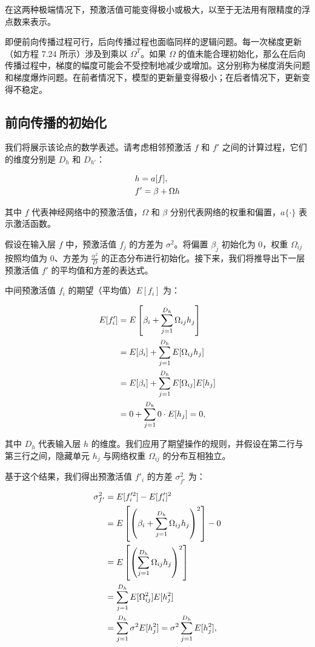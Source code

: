 \documentclass[lang=cn,newtx,10pt,scheme=chinese]{elegantbook}
\begin{document}
在这两种极端情况下，预激活值可能变得极小或极大，以至于无法用有限精度的浮点数来表示。

即便前向传播过程可行，后向传播过程也面临同样的逻辑问题。每一次梯度更新（如方程 7.24 所示）涉及到乘以 \(\Omega^T\)。如果 \(\Omega\) 的值未能合理初始化，那么在后向传播过程中，梯度的幅度可能会不受控制地减少或增加。这分别称为梯度消失问题和梯度爆炸问题。在前者情况下，模型的更新量变得极小；在后者情况下，更新变得不稳定。

\subsection{前向传播的初始化}

我们将展示该论点的数学表述。请考虑相邻预激活 \(f\) 和 \(f'\) 之间的计算过程，它们的维度分别是 \(D_h\) 和 \(D_{h'}\)：

\begin{align}
&h = a[f], \notag \\
&f' = \beta + \Omega h 
\end{align} 

其中 \(f\) 代表神经网络中的预激活值，\(\Omega\) 和 \(\beta\) 分别代表网络的权重和偏置，\(a\{\cdot\}\) 表示激活函数。

假设在输入层 \(f\) 中，预激活值 \(f_j\) 的方差为 \(\sigma^2\)。将偏置 \(\beta_j\) 初始化为 0，权重 \(\Omega_{ij}\) 按照均值为 0、方差为 \(\frac{\alpha^2}{D}\) 的正态分布进行初始化。接下来，我们将推导出下一层预激活值 \(f'\) 的平均值和方差的表达式。

中间预激活值 \(f_i\) 的期望（平均值）\(E[f_i]\) 为：

\begin{align}
E[f_i^\prime] &= E\left[\beta_i + \sum_{j=1}^{D_h} \Omega_{ij}h_j \right] \notag  \\
&= E[\beta_i] + \sum_{j=1}^{D_h} E[\Omega_{ij}h_j] \notag \\
&= E[\beta_i] + \sum_{j=1}^{D_h} E[\Omega_{ij}] E[h_j] \notag \\
&= 0 + \sum_{j=1}^{D_h} 0 \cdot E[h_j] = 0 , 
\end{align}

其中 \(D_h\) 代表输入层 \(h\) 的维度。我们应用了期望操作的规则，并假设在第二行与第三行之间，隐藏单元 \(h_j\) 与网络权重 \(\Omega_{ij}\) 的分布互相独立。

基于这个结果，我们得出预激活值 \(f'_i\) 的方差 \(\sigma_{f'}^2\) 为：

\begin{align}
\sigma_{f'}^2 &= E[f_i'^2] - E[f_i']^2 \notag \\
&= E\left[\left(\beta_i + \sum_{j=1}^{D_h} \Omega_{ij}h_j \right)^2\right] - 0 \notag \\
&= E\left[\left( \sum_{j=1}^{D_h} \Omega_{ij}h_j \right)^2\right] \notag \\
&= \sum_{j=1}^{D_h} E[\Omega_{ij}^2] E[h_j^2] \notag \\
&= \sum_{j=1}^{D_h} \sigma^2 E[h_j^2] = \sigma^2 \sum_{j=1}^{D_h} E[h_j^2], 
\end{align} 
\end{document}
